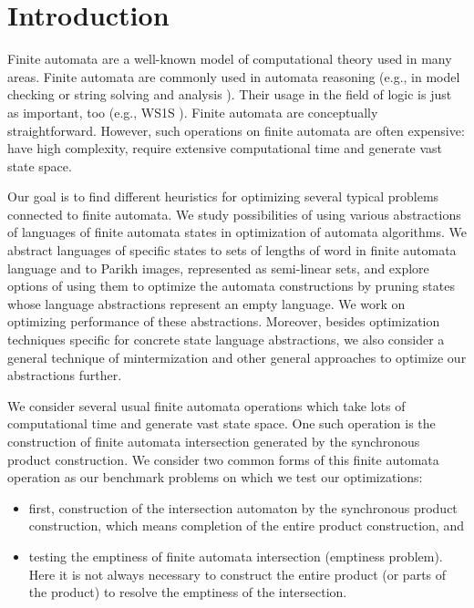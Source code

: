 \chapter{Introduction}


Finite automata are a well-known model of computational theory used in many areas. Finite automata are commonly used in automata reasoning (e.g., in model checking \cite{DBLP:conf/cav/SiegelY20} or string solving and analysis \cite{DBLP:conf/popl/LinB16}). Their usage in the field of logic is just as important, too (e.g., WS1S \cite{DBLP:conf/tacas/FiedorHJLV17, DBLP:journals/acta/FiedorHLV19}). Finite automata are conceptually straightforward. However, such operations on finite automata are often expensive: have high complexity, require extensive computational time and generate vast state space.

Our goal is to find different heuristics for optimizing several typical problems connected to finite automata. We study possibilities of using various abstractions of languages of finite automata states in optimization of automata algorithms. We abstract languages of specific states to sets of lengths of word in finite automata language and to Parikh images, represented as semi-linear sets, and explore options of using them to optimize the automata constructions by pruning states whose language abstractions represent an empty language. We work on optimizing performance of these abstractions. Moreover, besides optimization techniques specific for concrete state language abstractions, we also consider a general technique of mintermization and other general approaches to optimize our abstractions further.

We consider several usual finite automata operations which take lots of computational time and generate vast state space. One such operation is the construction of finite automata intersection generated by the synchronous product construction. We consider two common forms of this finite automata operation as our benchmark problems on which we test our optimizations:
\begin{itemize}
    \item first, construction of the intersection automaton by the synchronous product construction, which means completion of the entire product construction, and
    \item testing the emptiness of finite automata intersection (emptiness problem). Here it is not always necessary to construct the entire product (or parts of the product) to resolve the emptiness of the intersection.
\end{itemize}

